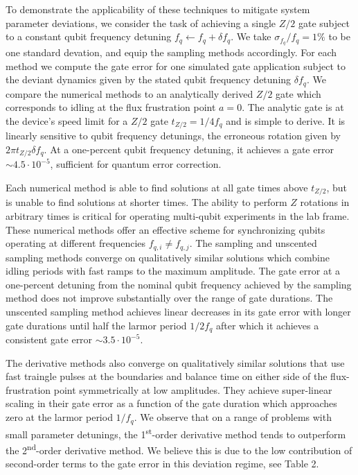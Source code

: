 \documentclass[
  amsfonts,
  amsmath,
  tbtags,
  amssymb,
  aps,
  nobibnotes,
  twocolumn,
  superscriptaddress,
]{revtex4-2}
\begin{document}
To demonstrate the applicability of these techniques
to mitigate system parameter deviations,
we consider the task of achieving a single $Z/2$
gate subject to a constant qubit frequency detuning
$f_{q} \gets f_{q} + \delta f_{q}$.
We take $\sigma_{f_{q}} / f_{q} = 1\%$ to be one standard devation, and equip
the sampling methods accordingly. For each method we compute the gate error for
one simulated gate application subject to the deviant dynamics given by the
stated qubit frequency detuning $\delta f_{q}$. We compare the numerical methods
to an analytically derived $Z/2$ gate which corresponds to
idling at the flux frustration point $a = 0$. The analytic gate
is at the device's speed limit for a $Z/2$ gate $t_{Z/2} = 1 / 4 f_{q}$ and
is simple to derive. It is linearly sensitive to qubit frequency detunings,
the erroneous rotation given by $2 \pi t_{Z/2} \delta f_{q}$. At a one-percent
qubit frequency detuning, it achieves a gate error $\sim 4.5 \cdot 10^{-5}$,
sufficient for quantum error correction.

Each numerical method is able to find solutions at
all gate times above $t_{Z/2}$, but is unable to find solutions at shorter times.
The ability to perform $Z$ rotations in arbitrary times
is critical for operating multi-qubit experiments in the lab frame.
These numerical methods offer an effective scheme for synchronizing
qubits operating at different frequencies $f_{q, i} \neq f_{q, j}$.
The sampling and unscented sampling methods
converge on qualitatively similar solutions which combine idling periods
with fast ramps to the maximum amplitude. The gate error at a one-percent
detuning from the nominal qubit frequency achieved
by the sampling method does not improve substantially over the
range of gate durations. The unscented sampling method
achieves linear decreases in its gate error with longer gate durations
until half the larmor period $1 / 2 f_{q}$ after which it achieves a consistent
gate error $\sim 3.5 \cdot 10^{-5}$.

The derivative methods also converge on qualitatively similar solutions that
use fast traingle pulses at the boundaries and balance time
on either side of the flux-frustration point symmetrically at low amplitudes.
They achieve super-linear scaling in their gate error as
a function of the gate duration which approaches zero at the larmor
period $1 / f_{q}$. We observe that on a range of problems with small parameter detunings,
the 1\textsuperscript{st}-order derivative method tends to outperform the 2\textsuperscript{nd}-order
derivative method. We believe this is due to the low contribution of second-order
terms to the gate error in this deviation regime, see Table 2.
\end{document}
